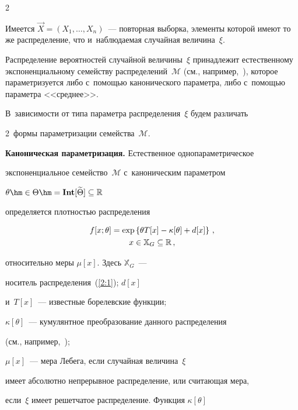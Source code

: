 \begin{multicols}{2}
\vspace*{-3pt}





   Имеется  $\vec{X}=(X_1 ,\ldots ,X_n) $~--- повторная выборка, элементы которой имеют то же распределение, что и~наблюдаемая случайная величина~$\xi$.


   Распределение вероятностей случайной величины~$\xi$ принадлежит естественному экспоненциальному семейству распределений~$\mathcal{M}$ (см., например,~\cite{15-ch}), которое параметризуется либо с~по\-мощью канонического параметра,  либо с~помощью параметра <<среднее>>.


   В~зависимости от типа параметра распределения~$\xi$ будем различать


   2~формы параметризации семейства~$\mathcal{M}$.





  \textbf{Каноническая параметризация.} Естественное однопараметрическое


  экспоненциальное семейство~$\mathcal{M}$ с~каноническим параметром


  $\theta  \hm\in \Theta \hm=\textbf{Int} [\widetilde{\Theta}]\subseteq \Rp$


  определяется плотностью распределения


 \begin{multline}


 f[x;\theta] =  \exp \left\{\theta T[x] - \kappa[\theta]+d[x]\right\}\,,\\


x\in {\mathbb X}_G \subseteq \Rp\,,


 \label{2:1}


 \end{multline}


  относительно меры $\mu[x]$. Здесь ${\mathbb X}_G$~--- 


  носитель распределения~(\ref{2:1}); $d[x]$ 


  и~$T[x]$~--- известные борелевские функции;


  $\kappa[\theta]$~--- кумулянтное преобразование данного распределения


  (см., например,~\cite[c.~13]{16-ch});


  $\mu[x]$~--- мера Лебега, если случайная величина~$\xi$


  имеет абсолютно непрерывное распределение, или считающая мера,


  если~$\xi$  имеет решетчатое распределение. Функция $\kappa[\theta]$



\end{multicols}
